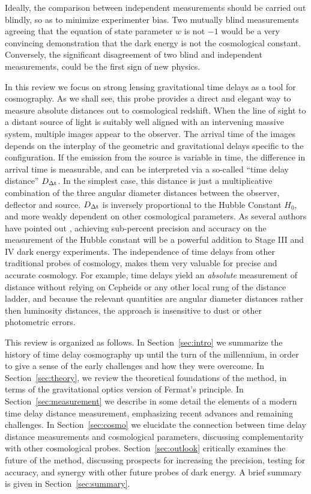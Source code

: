 Ideally, the comparison between independent measurements should be
carried out blindly, so as to minimize experimenter bias. Two mutually
blind measurements agreeing that the equation of state parameter $w$
is not $-1$ would be a very convincing demonstration that the dark
energy is not the cosmological constant. Conversely, the significant
disagreement of two blind and independent measurements, could be the
first sign of new physics.

In this review we focus on strong lensing gravitational time delays as
a tool for cosmography. As we shall see, this probe provides a direct
and elegant way to measure absolute distances out to cosmological
redshift. When the line of sight to a distant source of light is
suitably well aligned with an intervening massive system, multiple
images appear to the observer. The arrival time of the images depends
on the interplay of the geometric and gravitational delays specific to
the configuration. If the emission from the source is variable in
time, the difference in arrival time is measurable, and can be
interpreted via a so-called ``time delay distance'' $D_{\Delta{\rm t}}$.
In the simplest case, this distance is just a multiplicative combination
of the three angular diameter distances between the observer, deflector and
source. $D_{\Delta{\rm t}}$ is
inversely proportional to the Hubble Constant $H_0$, and more
weakly dependent on other cosmological parameters. As several authors
have pointed out \citep{Hu05,Lin11,Suy++12,Wei++13}, achieving
sub-percent precision and accuracy on the measurement of the Hubble
constant will be a powerful addition to Stage III and IV dark energy
experiments. The independence of time delays from other traditional
probes of cosmology, makes them very valuable for precise and accurate
cosmology. For example, time delays yield an {\it absolute}
measurement of distance without relying on Cepheids or any other local
rung of the distance ladder, and because the relevant quantities are
angular diameter distances rather then luminosity distances, the
approach is insensitive to dust or
other photometric errors.

This review is organized as follows. In Section~\ref{sec:intro} we
summarize the history of time delay cosmography up until the turn of
the millennium, in order to give a sense of the early challenges and
how they were overcome. In Section~\ref{sec:theory}, we review the
theoretical foundations of the method, in terms of the gravitational
optics version of Fermat's principle. In Section~\ref{sec:measurement}
we describe in some detail the elements of a modern time delay
distance measurement, emphasizing recent advances and remaining
challenges. In Section~\ref{sec:cosmo} we elucidate the connection
between time delay distance measurements and cosmological parameters,
discussing complementarity with other cosmological
probes. Section~\ref{sec:outlook} critically examines the future of
the method, discussing prospects for increasing the precision, testing
for accuracy, and synergy with other future probes of dark energy. A
brief summary is given in Section~\ref{sec:summary}.

